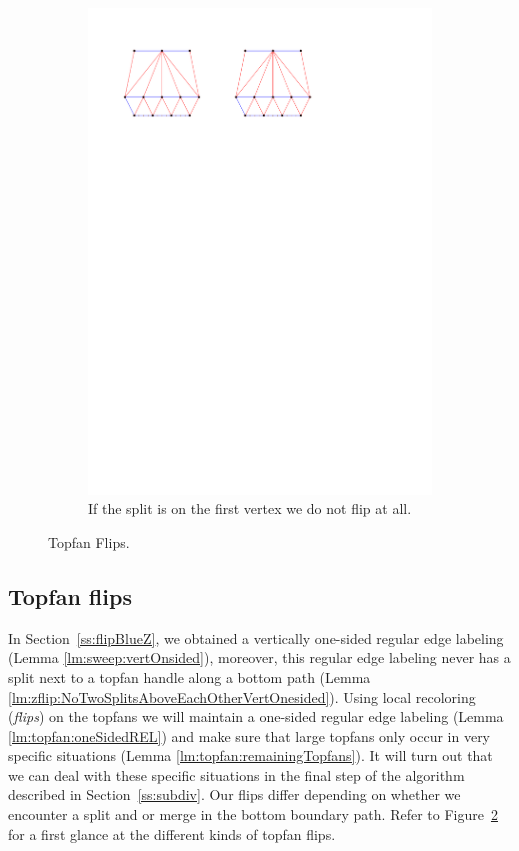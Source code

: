 \begin{figure}[!b]
\begin{subfigure}[t]{0.45 \textwidth}
        \includegraphics[width =\textwidth]{topFanFlips/img/splitfront}
        \caption{If the split is on the first vertex we do not flip at all.}
        \label{fig:fanflip:splitFirstVertex}
    \end{subfigure}

    \caption{Topfan Flips.}
    \label{fig:fanflip:fanflips}
\end{figure}

\subsection{Topfan flips}
\thispagestyle{plain}
\label{ss:fanflip}

In Section~\ref{ss:flipBlueZ}, we obtained a vertically one-sided regular edge labeling (Lemma \ref{lm:sweep:vertOnsided}), moreover, this regular edge labeling never has a split next to a topfan handle along a bottom path (Lemma \ref{lm:zflip:NoTwoSplitsAboveEachOtherVertOnesided}).
Using local recoloring (\emph{flips}) on the topfans we will maintain a one-sided regular edge labeling (Lemma \ref{lm:topfan:oneSidedREL}) and make sure that large topfans only occur in very specific situations (Lemma \ref{lm:topfan:remainingTopfans}). It will turn out that we can deal with these specific situations in the final step of the algorithm described in Section~\ref{ss:subdiv}.
Our flips differ depending on whether we encounter a split and or merge in the bottom boundary path.
Refer to Figure~\ref{fig:fanflip:fanflips} for a first glance at the different kinds of topfan flips.


